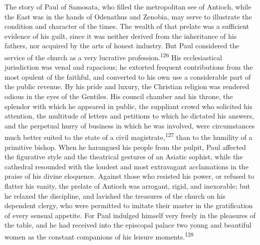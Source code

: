 The story of Paul of Samosata, who filled the metropolitan see of
Antioch, while the East was in the hands of Odenathus and
Zenobia, may serve to illustrate the condition and character of
the times. The wealth of that prelate was a sufficient evidence
of his guilt, since it was neither derived from the inheritance
of his fathers, nor acquired by the arts of honest industry. But
Paul considered the service of the church as a very lucrative
profession.\textsuperscript{126} His ecclesiastical jurisdiction was venal and
rapacious; he extorted frequent contributions from the most
opulent of the faithful, and converted to his own use a
considerable part of the public revenue. By his pride and luxury,
the Christian religion was rendered odious in the eyes of the
Gentiles. His council chamber and his throne, the splendor with
which he appeared in public, the suppliant crowd who solicited
his attention, the multitude of letters and petitions to which he
dictated his answers, and the perpetual hurry of business in
which he was involved, were circumstances much better suited to
the state of a civil magistrate,\textsuperscript{127} than to the humility of a
primitive bishop. When he harangued his people from the pulpit,
Paul affected the figurative style and the theatrical gestures of
an Asiatic sophist, while the cathedral resounded with the
loudest and most extravagant acclamations in the praise of his
divine eloquence. Against those who resisted his power, or
refused to flatter his vanity, the prelate of Antioch was
arrogant, rigid, and inexorable; but he relaxed the discipline,
and lavished the treasures of the church on his dependent clergy,
who were permitted to imitate their master in the gratification
of every sensual appetite. For Paul indulged himself very freely
in the pleasures of the table, and he had received into the
episcopal palace two young and beautiful women as the constant
companions of his leisure moments.\textsuperscript{128}




